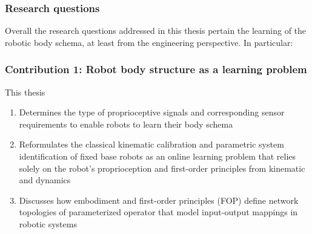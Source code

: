 \documentclass[12pt, a4paper]{article}
\begin{document}
\subsubsection*{Research questions}
Overall the research questions addressed in this thesis pertain the learning of the robotic body schema, at least from the engineering perspective. In particular:
\begin{shaded}
\end{shaded}
\begin{shaded}
\end{shaded}
\begin{shaded}
\end{shaded}

\subsubsection*{Contribution 1: Robot body structure as a learning problem}
This thesis
\begin{enumerate}
	\item Determines the type of proprioceptive signals and corresponding sensor requirements to enable robots to learn their body schema	
	\item Reformulates the classical kinematic calibration and parametric system identification of fixed base robots as an online learning problem that relies solely on the robot's proprioception and first-order principles from kinematic and dynamics 
	\item Discusses how embodiment and first-order principles (FOP) define network topologies of parameterized operator that model input-output mappings in robotic systems
\end{enumerate}
\end{document}
